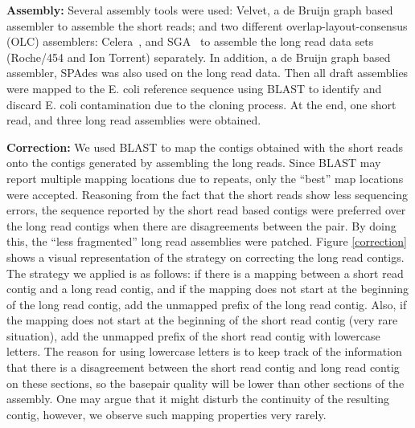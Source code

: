 \documentclass[12pt,a4paper]{cibb}
\begin{document}
\textbf{Assembly:} Several assembly tools were used: Velvet\cite{velvetZerbino:2008}, a de Bruijn graph based assembler to assemble the short reads; and two different overlap-layout-consensus (OLC) assemblers: Celera~\cite{celera:2000}, and SGA~\cite{sga:2012} to assemble the long read data sets (Roche/454 and Ion Torrent) separately. In addition, a de Bruijn graph based assembler, SPAdes\cite{spadesBankevich:2012} was also used on the long read data. 
Then all draft assemblies were mapped to the E. coli reference sequence using BLAST\cite{blast} to identify and discard E. coli contamination due to the cloning process. At the end, one short read, and three long read assemblies were obtained.

\textbf{Correction:} We used BLAST \cite{blast}  to map the contigs obtained with the short reads onto the contigs generated by assembling the long reads. Since BLAST may report multiple mapping locations due to repeats, only the ``best'' map locations were accepted. Reasoning from the fact that the short reads show less sequencing errors, the sequence reported by the short read based contigs were preferred over the long read contigs when there are disagreements between the pair. By doing this, the ``less fragmented'' long read assemblies were patched. Figure \ref{correction} shows a visual representation of the strategy on correcting the long read contigs. The strategy we applied is as follows: if there is a mapping between a short read contig and a long read contig, and if the mapping does not start at the beginning of the long read contig, add the unmapped prefix of the long read contig. Also, if the mapping does not start at the beginning of the short read contig (very rare situation), add the unmapped prefix of the short read contig with lowercase letters. The reason for using lowercase letters is to keep track of the information that there is a disagreement between the short read contig and long read contig on these sections, so the basepair quality will be lower than other sections of the assembly. One may argue that it might disturb the continuity of the resulting contig, however, we observe such mapping properties  very rarely.
\end{document}
